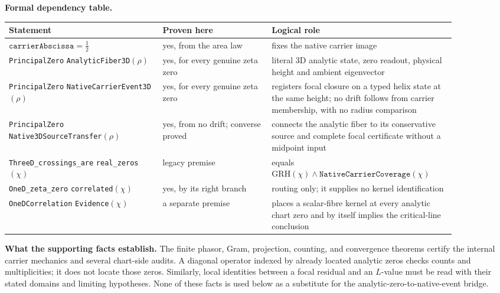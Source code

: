 \medskip
\noindent\textbf{Formal dependency table.}
\begin{center}
\small
\renewcommand{\arraystretch}{1.15}
\begin{tabular}{p{0.31\linewidth}|p{0.22\linewidth}|p{0.35\linewidth}}
Statement & Proven here & Logical role\\
\hline
\(\texttt{carrierAbscissa}=\tfrac12\) & yes, from the area law & fixes the
native carrier image\\
\shortstack[l]{\texttt{PrincipalZero}\\
\texttt{AnalyticFiber3D}\((\rho)\)} & yes, for every genuine
zeta zero & literal 3D analytic state, zero readout, physical height and
ambient eigenvector\\
\shortstack[l]{\texttt{PrincipalZero}\\
\texttt{NativeCarrierEvent3D}\((\rho)\)} & yes, for every genuine
zeta zero & registers focal closure on a typed helix state at the same height;
no drift follows from carrier membership, with no radius comparison\\
\shortstack[l]{\texttt{PrincipalZero}\\
\texttt{Native3DSourceTransfer}\((\rho)\)} & yes, from no drift; converse proved &
connects the analytic fiber to its conservative source and complete focal
certificate without a midpoint input\\
\shortstack[l]{\texttt{ThreeD\_crossings\_are}\\
\texttt{real\_zeros}\((\chi)\)} & legacy premise &
equals \(\mathrm{GRH}(\chi)\wedge\texttt{NativeCarrierCoverage}(\chi)\)\\
\shortstack[l]{\texttt{OneD\_zeta\_zero}\\
\texttt{correlated}\((\chi)\)} & yes, by its right branch &
routing only; it supplies no kernel identification\\
\shortstack[l]{\texttt{OneDCorrelation}\\
\texttt{Evidence}\((\chi)\)} & a separate premise & places a
scalar-fibre kernel at every analytic chart zero and by itself implies the
critical-line conclusion\\
\end{tabular}
\end{center}

\medskip
\noindent\textbf{What the supporting facts establish.}  The finite phasor,
Gram, projection, counting, and convergence theorems certify the internal
carrier mechanics and several chart-side audits.  A diagonal operator indexed
by already located analytic zeros checks counts and multiplicities; it does
not locate those zeros.  Similarly, local identities between a focal residual
and an \(L\)-value must be read with their stated domains and limiting
hypotheses.  None of these facts is used below as a substitute for the
analytic-zero-to-native-event bridge.

